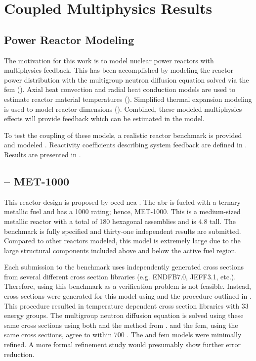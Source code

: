\chapter{Coupled Multiphysics Results}
\label{ch:coupledResults}

\section{Power Reactor Modeling}
\label{sec:power_reactor_modeling}
  The motivation for this work is to model nuclear power reactors with
  multiphysics feedback. This has been accomplished by modeling the reactor
  power distribution with the multigroup neutron diffusion equation solved via
  the \gls{fem} (). Axial heat convection and radial
  heat conduction models are used to estimate reactor material temperatures
  ().  Simplified thermal expansion modeling is used
  to model reactor dimensions (). Combined, these
  modeled multiphysics effects will provide feedback which can be estimated in
  the model. 
  
  To test the coupling of these models, a realistic reactor benchmark is
  provided and modeled . Reactivity coefficients describing system
  feedback are defined in . Results are
  presented in .

\section{ -- MET-1000}
\label{sec:abr}
  This reactor design is proposed by \gls{oecd} \gls{nea} \cite{abr}. The 
  \gls{abr} is fueled with a ternary metallic fuel and has a 1000
   rating; hence, MET-1000. This is a medium-sized metallic reactor 
  with a total of 180 hexagonal assemblies and is 4.8  tall. The 
  benchmark is fully specified and thirty-one independent results are submitted. 
  Compared to other reactors modeled, this model is extremely large due to the
  large structural components included above and below the active fuel region.
  
  Each submission to the benchmark uses independently generated cross sections
  from several different cross section libraries (e.g. ENDFB7.0, JEFF3.1, etc.).
  Therefore, using this benchmark as a verification problem is not feasible.
  Instead, cross sections were generated for this model using \mcc and the
  procedure outlined in . This procedure
  resulted in temperature dependent cross section libraries with 33 energy
  groups. The multigroup neutron diffusion equation is solved using these same
  cross sections using both \dif and the method from
  . \dif and the \gls{fem}, using the same cross
  sections, agree to within 700 . The
  \dif and \gls{fem} models were minimally refined. A more formal refinement
  study would presumably show further error reduction. 
  
